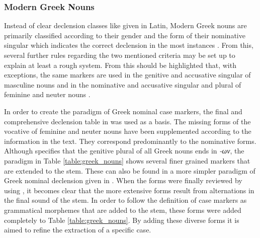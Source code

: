 \documentclass[11pt,a4paper,twoside,openright]{scrbook}
\begin{document}
\subsubsection{Modern Greek Nouns}

Instead of clear declension classes like given in Latin, Modern Greek nouns are primarily classified according to their gender and the form of their nominative singular which indicates the correct declension in the most instances \citep{holton2016greek}. From this, several further rules regarding the two mentioned criteria may be set up to explain at least a rough system. From this should be highlighted that, with exceptions, the same markers are used in the genitive and accusative singular of masculine nouns and in the nominative and accusative singular and plural of feminine and neuter nouns \citep{holton2016greek}.

In order to create the paradigm of Greek nominal case markers, the final and comprehensive declension table in \citet{holton2016greek} was used as a basis. The missing forms of the vocative of feminine and neuter nouns have been supplemented according to the information in the text. They correspond predominantly to the nominative forms. Although \citet{holton2016greek} specifies that the genitive plural of all Greek nouns ends in \foreignlanguage{greek}{\textit{-ων}}, the paradigm in Table \ref{table:greek_nouns} shows several finer grained markers that are extended to the stem. These can also be found in a more simpler paradigm of Greek nominal declension given in \citet{metger1998greek}. When the forms were finally reviewed by using \citet{ruge2001greek}, it becomes clear that the more extensive forms result from alternations in the final sound of the stem. In order to follow the definition of case markers as grammatical morphemes that are added to the stem, these forms were added completely to Table \ref{table:greek_nouns}. By adding these diverse forms it is aimed to refine the extraction of a specific case. 
\end{document}
